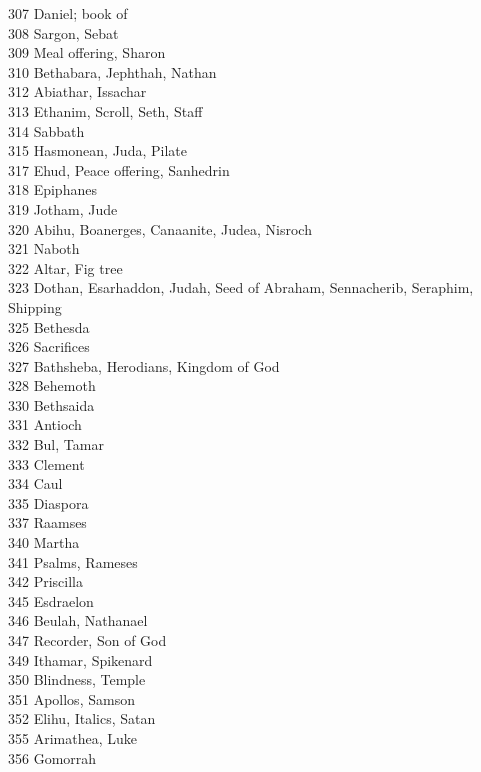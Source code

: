 307 \quad Daniel; book of\\
308 \quad Sargon, Sebat\\
309 \quad Meal offering, Sharon\\
310 \quad Bethabara, Jephthah, Nathan\\
312 \quad Abiathar, Issachar\\
313 \quad Ethanim, Scroll, Seth, Staff\\
314 \quad Sabbath\\
315 \quad Hasmonean, Juda, Pilate\\
317 \quad Ehud, Peace offering, Sanhedrin\\
318 \quad Epiphanes\\
319 \quad Jotham, Jude\\
320 \quad Abihu, Boanerges, Canaanite, Judea, Nisroch\\
321 \quad Naboth\\
322 \quad Altar, Fig tree\\
323 \quad Dothan, Esarhaddon, Judah, Seed of Abraham, Sennacherib, Seraphim, Shipping\\
325 \quad Bethesda\\
326 \quad Sacrifices\\
327 \quad Bathsheba, Herodians, Kingdom of God\\
328 \quad Behemoth\\
330 \quad Bethsaida\\
331 \quad Antioch\\
332 \quad Bul, Tamar\\
333 \quad Clement\\
334 \quad Caul\\
335 \quad Diaspora\\
337 \quad Raamses\\
340 \quad Martha\\
341 \quad Psalms, Rameses\\
342 \quad Priscilla\\
345 \quad Esdraelon\\
346 \quad Beulah, Nathanael\\
347 \quad Recorder, Son of God\\
349 \quad Ithamar, Spikenard\\
350 \quad Blindness, Temple\\
351 \quad Apollos, Samson\\
352 \quad Elihu, Italics, Satan\\
355 \quad Arimathea, Luke\\
356 \quad Gomorrah\\

